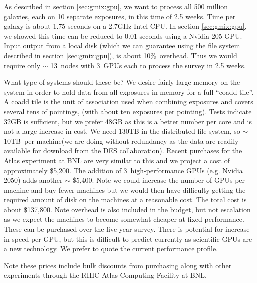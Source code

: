 \documentclass[12pt]{article}
\newcommand{\iooverhead}{10\%}
\newcommand{\nmachines}{13}
\newcommand{\ngpus}{3}
\newcommand{\basecost}{\$5,200}
\newcommand{\costgpu}{\$5,400}
\newcommand{\diskper}{10TB}
\newcommand{\totalcost}{\$137,800}
\begin{document}
As described in section \ref{sec:gmix:gpu}, we want to process all 500 million
galaxies, each on 10 separate exposures, in this time of 2.5 weeks. Time per
galaxy is about 1.75 seconds on a 2.7GHz Intel CPU. In section
\ref{sec:gmix:gpu}, we showed this time can be reduced to 0.01 seconds using a
Nvidia 205 GPU.  Input output from a local disk (which we can guarantee using
the file system described in section \ref{sec:gmix:gpu}), is about \iooverhead\
overhead.  Thus we would require only $\sim$ \nmachines\ nodes with \ngpus\
GPUs each to process the survey in 2.5 weeks. 

What type of systems should these be?  We desire fairly large memory on the
system in order to hold data from all exposures in memory for a full ``coadd
tile''. A coadd tile is the unit of association used when combining exposures
and covers several tens of pointings, (with about ten exposures per pointing).
Tests indicate 32GB is sufficient, but we prefer 48GB as this is a better
number per core and is not a large increase in cost.  We need 130TB in the
distributed file system, so $\sim$ \diskper\ per machine(we are doing without
redundancy as the data are readily available for download from the DES
collaboration).  Recent purchases for the Atlas experiment at BNL are very
similar to this and we project a cost of approximately \basecost.  The addition
of \ngpus\ high-performance GPUs (e.g.  Nvidia 2050) adds another $\sim$
\costgpu. Note we could increase the number of GPUs per machine and buy fewer
machines but we would then have difficulty getting the required amount of disk
on the machines at a reasonable cost.  The total cost is about \totalcost.
Note overhead is also included in the budget, but not escalation as we expect
the machines to become somewhat cheaper at fixed performance.  These can be
purchased over the five year survey.  There is potential for increase in speed
per GPU, but this is difficult to predict currently as scientific GPUs are a
new technology.  We prefer to quote the current performance profile.

Note these prices include bulk discounts from purchasing along with other
experiments through the RHIC-Atlas Computing Facility at BNL.  


\end{document}
